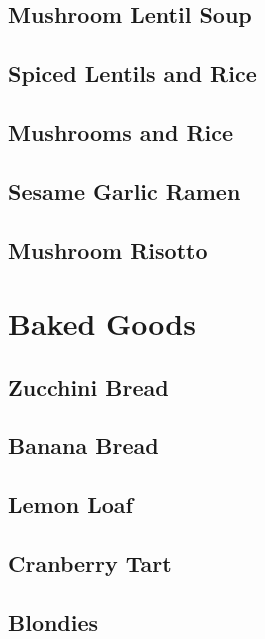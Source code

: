 \documentclass{report}
\begin{document}
\section{Mushroom Lentil Soup}

\newpage
\section{Spiced Lentils and Rice}

\newpage
\section{Mushrooms and Rice}

\newpage
\section{Sesame Garlic Ramen}

\newpage
\section{Mushroom Risotto}




\chapter{Baked Goods}
\newpage
\section{Zucchini Bread}


\newpage
\section{Banana Bread}


\newpage
\section{Lemon Loaf}


\newpage 
\section{Cranberry Tart}


\newpage
\section{Blondies}

\end{document}
